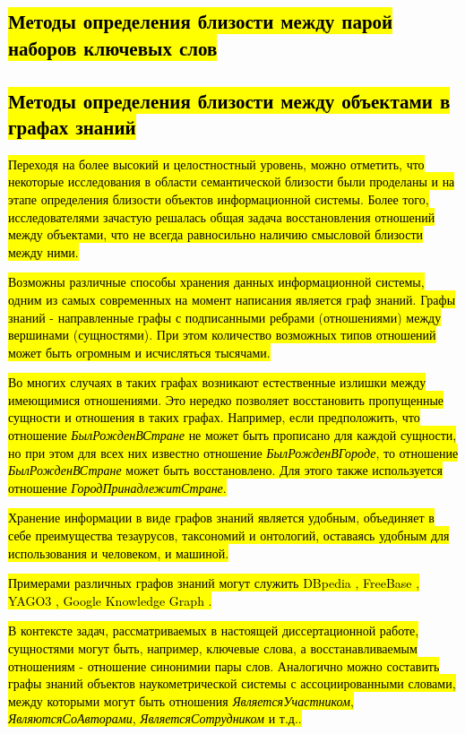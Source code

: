 \subsection{\hl{Методы определения близости между парой наборов ключевых слов}}
\subsection{\hl{Методы определения близости между объектами в графах знаний}} \label{kg_subsection}
\hl{Переходя на более высокий и целостностный уровень, можно отметить, что некоторые исследования в области семантической близости были проделаны и на этапе определения близости объектов информационной системы. Более того, исследователями зачастую решалась общая задача восстановления отношений между объектами, что не всегда равносильно наличию смысловой близости между ними. }

\hl{Возможны различные способы хранения данных информационной системы, одним из самых современных на момент написания является граф знаний. Графы знаний - направленные графы с подписанными ребрами (отношениями) между вершинами (сущностями). При этом количество возможных типов отношений может быть огромным и исчисляться тысячами.}

\hl{Во многих случаях в таких графах возникают естественные излишки между имеющимися отношениями. Это нередко позволяет восстановить пропущенные сущности и отношения в таких графах. Например, если предположить, что отношение \emph{БылРожденВСтране} не может быть прописано для каждой сущности, но при этом для всех них известно отношение \emph{БылРожденВГороде}, то отношение \emph{БылРожденВСтране} может быть восстановлено. Для этого также используется отношение \emph{ГородПринадлежитСтране}. }

\hl{Хранение информации в виде графов знаний является удобным, объединяет в себе преимущества тезаурусов, таксономий и онтологий, оставаясь удобным для использования и человеком, и машиной.}

\hl{Примерами различных графов знаний могут служить DBpedia \cite{dbpedia}, FreeBase \cite{freebase}, YAGO3 \cite{yago3}, Google Knowledge Graph \cite{google_kg}. }

\hl{В контексте задач, рассматриваемых в настоящей диссертационной работе, сущностями могут быть, например, ключевые слова, а восстанавливаемым отношениям - отношение синонимии пары слов. Аналогично можно составить графы знаний объектов наукометрической системы с ассоциированными словами, между которыми могут быть отношения \emph{ЯвляетсяУчастником}, \emph{ЯвляютсяСоАвторами}, \emph{ЯвляетсяСотрудником} и т.д..}

